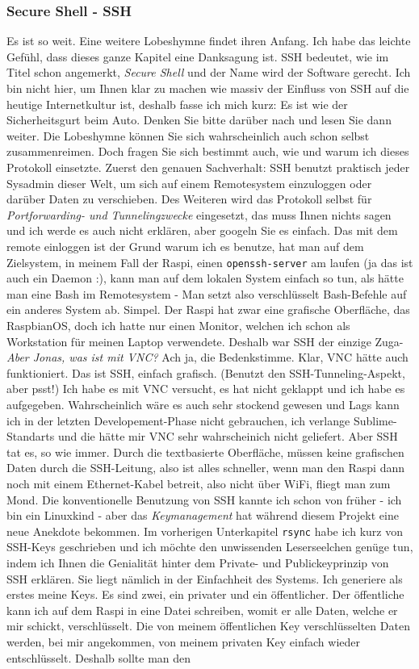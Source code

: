\documentclass[12pt,titlepage,a4paper]{article}
\begin{document}
\subsubsection{Secure Shell - SSH}
Es ist so weit. Eine weitere Lobeshymne findet ihren Anfang. Ich habe das leichte Gefühl, dass dieses ganze Kapitel eine Danksagung ist. SSH bedeutet, wie im Titel schon angemerkt, \textit{Secure Shell} und der Name wird der Software gerecht. Ich bin nicht hier, um Ihnen klar zu machen wie massiv der Einfluss von SSH auf die heutige Internetkultur ist, deshalb fasse ich mich kurz: Es ist wie der Sicherheitsgurt beim Auto. Denken Sie bitte darüber nach und lesen Sie dann weiter. Die Lobeshymne können Sie sich wahrscheinlich auch schon selbst zusammenreimen. Doch fragen Sie sich bestimmt auch, wie und warum ich dieses Protokoll einsetzte. Zuerst den genauen Sachverhalt: SSH benutzt praktisch jeder Sysadmin dieser Welt, um sich auf einem Remotesystem einzuloggen oder darüber Daten zu verschieben. Des Weiteren wird das Protokoll selbst für \textit{Portforwarding- und Tunnelingzwecke} eingesetzt, das muss Ihnen nichts sagen und ich werde es auch nicht erklären, aber googeln Sie es einfach. Das mit dem remote einloggen ist der Grund warum ich es benutze, hat man auf dem Zielsystem, in meinem Fall der Raspi, einen \verb^openssh-server^ am laufen (ja das ist auch ein Daemon :), kann man auf dem lokalen System einfach so tun, als hätte man eine Bash im Remotesystem - Man setzt also verschlüsselt Bash-Befehle auf ein anderes System ab. Simpel. Der Raspi hat zwar eine grafische Oberfläche, das RaspbianOS, doch ich hatte nur einen Monitor, welchen ich schon als Workstation für meinen Laptop verwendete. Deshalb war SSH der einzige Zuga- \textit{Aber Jonas, was ist mit VNC?} Ach ja, die Bedenkstimme. Klar, VNC hätte auch funktioniert. Das ist SSH, einfach grafisch. (Benutzt den SSH-Tunneling-Aspekt, aber psst!) Ich habe es mit VNC versucht, es hat nicht geklappt und ich habe es aufgegeben. Wahrscheinlich wäre es auch sehr stockend gewesen und Lags kann ich in der letzten Developement-Phase nicht gebrauchen, ich verlange Sublime-Standarts und die hätte mir VNC sehr wahrscheinich nicht geliefert. Aber SSH tat es, so wie immer. Durch die textbasierte Oberfläche, müssen keine grafischen Daten durch die SSH-Leitung, also ist alles schneller, wenn man den Raspi dann noch mit einem Ethernet-Kabel betreit, also nicht über WiFi, fliegt man zum Mond. Die konventionelle Benutzung von SSH kannte ich schon von früher - ich bin ein Linuxkind - aber das \textit{Keymanagement} hat während diesem Projekt eine neue Anekdote bekommen. Im vorherigen Unterkapitel \verb/rsync/ habe ich kurz von SSH-Keys geschrieben und ich möchte den unwissenden Leserseelchen genüge tun, indem ich Ihnen die Genialität hinter dem Private- und Publickeyprinzip von SSH  erklären. Sie liegt nämlich in der Einfachheit des Systems. Ich generiere als erstes meine Keys. Es sind zwei, ein privater und ein öffentlicher. Der öffentliche kann ich auf dem Raspi in eine Datei schreiben, womit er alle Daten, welche er mir schickt, verschlüsselt. Die von meinem öffentlichen Key verschlüsselten Daten werden, bei mir angekommen, von meinem privaten Key einfach wieder entschlüsselt. Deshalb sollte man den 
\end{document}
